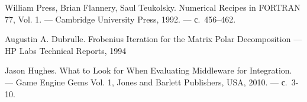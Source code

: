 \documentclass[a4paper,11pt]{report}
\begin{document}
\begin{thebibliography}{9}
      William Press, Brian Flannery, Saul Teukolsky.
      \newblock Numerical Recipes in FORTRAN 77, Vol. 1.
      \newblock --- Cambridge University Press, 1992.
      \newblock --- с.~456--462.

      Augustin A. Dubrulle.
      \newblock Frobenius Iteration for the Matrix Polar Decomposition
      \newblock --- HP Labs Technical Reports, 1994

      Jason Hughes.
      \newblock What to Look for When Evaluating Middleware for Integration.
      \newblock --- Game Engine Gems Vol. 1, Jones and Barlett Publishers, USA, 2010.
      \newblock --- с.~3-10.
  \end{thebibliography}
\end{document}

